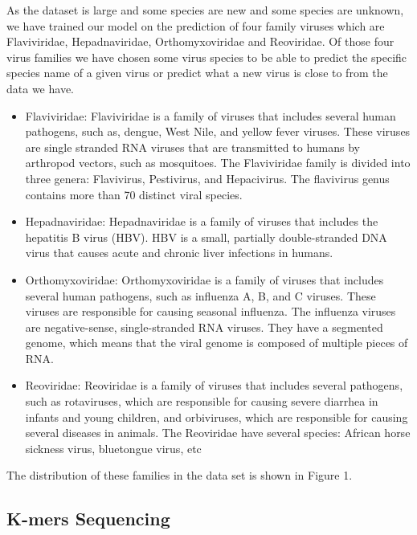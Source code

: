As the dataset is large and some species are new and some species are unknown, we have trained our model on the prediction of four family viruses which are Flaviviridae,  Hepadnaviridae, Orthomyxoviridae and Reoviridae. Of those four virus families we have chosen some virus species to be able to predict the specific species name of a given virus or predict what a new virus is close to from the data we have.

\begin{itemize}
\item{Flaviviridae}: Flaviviridae is a family of viruses that includes several human pathogens, such as, dengue, West Nile, and yellow fever viruses. These viruses are single stranded RNA viruses that are transmitted to humans by arthropod vectors, such as mosquitoes. The Flaviviridae family is divided into three genera: Flavivirus, Pestivirus, and Hepacivirus. The flavivirus genus  contains more than 70 distinct viral species.  

\item{Hepadnaviridae}: Hepadnaviridae is a family of viruses that includes the hepatitis B virus (HBV). HBV is a small, partially double-stranded DNA virus that causes acute and chronic liver infections in humans. 

\item{Orthomyxoviridae}: Orthomyxoviridae is a family of viruses that includes several human pathogens, such as influenza A, B, and C viruses. These viruses are responsible for causing seasonal influenza. The influenza viruses are negative-sense, single-stranded RNA viruses. They have a segmented genome, which means that the viral genome is composed of multiple pieces of RNA.

\item{Reoviridae}: Reoviridae is a family of viruses that includes several pathogens, such as rotaviruses, which are responsible for causing severe diarrhea in infants and young children, and orbiviruses, which are responsible for causing several diseases in animals.  The Reoviridae have several species: African horse sickness virus, bluetongue virus, etc 
\end{itemize}

The distribution of these families in the data set is shown in Figure 1.

\subsection{K-mers Sequencing}










